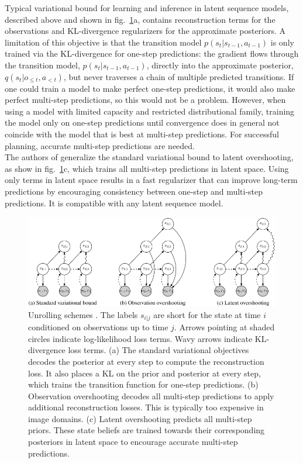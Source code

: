 Typical variational bound for learning and inference in latent sequence models, described above and shown in fig.~\ref{Fig.PlaNetModelUnrolling}a, contains reconstruction terms for the observations and KL-divergence regularizers for the approximate posteriors. A limitation of this objective is that the transition model $p(s_t | s_{t-1}, a_{t-1})$ is only trained via the KL-divergence for one-step predictions: the gradient flows through the transition model, $p(s_t | s_{t-1}, a_{t-1})$, directly into the approximate posterior, $q(s_t | o_{\leqslant t}, a_{<t})$, but never traverses a chain of multiple predicted transitions. If one could train a model to make perfect one-step predictions, it would also make perfect multi-step predictions, so this would not be a problem. However, when using a model with limited capacity and restricted distributional family, training the model only on one-step predictions until convergence does in general not coincide with the model that is best at multi-step predictions. For successful planning, accurate multi-step predictions are needed. \\
The authors of \cite{Algo.PlaNet} generalize the standard variational bound to latent overshooting, as show in fig.~\ref{Fig.PlaNetModelUnrolling}c, which trains all multi-step predictions in latent space. Using only terms in latent space results in a fast regularizer that can improve long-term predictions by encouraging consistency between one-step and multi-step predictions. It is compatible with any latent sequence model. \\

\begin{figure}[H]
\includegraphics[width=1.0\textwidth,keepaspectratio]{figures/PlaNet/overshooting.png}
\caption[PlaNet latent dynamics model unrolling schemes]{Unrolling schemes \protect\cite{Algo.PlaNet}. The labels $s_{i|j}$ are short for the state at time $i$ conditioned on observations up to time $j$. Arrows pointing at shaded circles indicate log-likelihood loss terms. Wavy arrows indicate KL-divergence loss terms. (a) The standard variational objectives decodes the posterior at every step to compute the reconstruction loss. It also places a KL on the prior and posterior at every step, which trains the transition function for one-step predictions. (b) Observation overshooting decodes all multi-step predictions to apply additional reconstruction losses. This is typically too expensive in image domains. (c) Latent overshooting predicts all multi-step priors. These state beliefs are trained towards their corresponding posteriors in latent space to encourage accurate multi-step predictions.}
\label{Fig.PlaNetModelUnrolling}
\end{figure}

